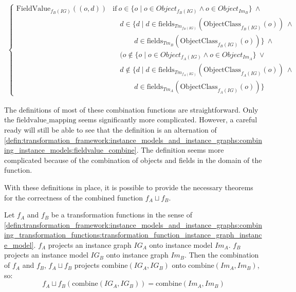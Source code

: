 \begin{defin}
\begin{multline*}
\begin{cases}
        \mathrm{FieldValue}_{f_{B}(IG)}(( o, d )) & \mathrm{if}\ o \in \{o \mid o \in Object_{f_{B}(IG)} \land o \in Object_{Im_B} \}\ \land \\&\quad d \in \{d \mid d \in \mathrm{fields}_{Tm_{f_{B}(IG)}}(\mathrm{ObjectClass}_{f_{B}(IG)}(o))\ \land \\&\qquad\quad d \in \mathrm{fields}_{Tm_B}(\mathrm{ObjectClass}_{f_{B}(IG)}(o)) \}\ \land\\&\quad (o \not\in \{o \mid o \in Object_{f_{A}(IG)} \land o \in Object_{Im_A} \}\ \lor \\&\quad d \not\in \{d \mid d \in \mathrm{fields}_{Tm_{f_{A}(IG)}}(\mathrm{ObjectClass}_{f_{A}(IG)}(o))\ \land \\&\qquad\quad d \in \mathrm{fields}_{Tm_A}(\mathrm{ObjectClass}_{f_{A}(IG)}(o)) \}
    \end{cases}
\end{multline*}
\end{defin}

The definitions of most of these combination functions are straightforward. Only the $\mathrm{fieldvalue\_\!mapping}$ seems significantly more complicated. However, a careful ready will still be able to see that the definition is an alternation of \cref{defin:transformation_framework:instance_models_and_instance_graphs:combining_instance_models:fieldvalue_combine}. The definition seems more complicated because of the combination of objects and fields in the domain of the function.

With these definitions in place, it is possible to provide the necessary theorems for the correctness of the combined function $f_{A} \sqcup f_{B}$.

\begin{thm}
\label{defin:transformation_framework:instance_models_and_instance_graphs:combining_transformation_functions:imod_combine_mapping_correct}
Let $f_A$ and $f_B$ be a transformation functions in the sense of \cref{defin:transformation_framework:instance_models_and_instance_graphs:combining_transformation_functions:transformation_function_instance_graph_instance_model}. $f_A$ projects an instance graph $IG_A$ onto instance model $Im_A$. $f_B$ projects an instance model $IG_B$ onto instance graph $Im_B$. Then the combination of $f_A$ and $f_B$, $f_{A} \sqcup f_{B}$ projects $\mathrm{combine}(IG_A, IG_B)$ onto $\mathrm{combine}(Im_A, Im_B)$, so:
\begin{equation*}
    f_{A} \sqcup f_{B}(\mathrm{combine}(IG_A, IG_B)) = \mathrm{combine}(Im_A, Im_B)
\end{equation*}
\end{thm}

